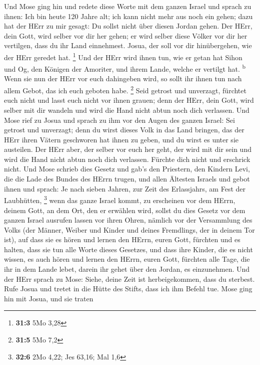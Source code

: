  Und Mose ging hin und redete diese Worte mit dem ganzen
Israel  und sprach zu ihnen: Ich bin heute 120 Jahre alt;
ich kann nicht mehr aus noch ein gehen; dazu hat der HErr zu mir gesagt:
Du sollst nicht über diesen Jordan gehen.  Der HErr, dein
Gott, wird selber vor dir her gehen; er wird selber diese Völker vor dir
her vertilgen, dass du ihr Land einnehmest. Josua, der soll vor dir
hinübergehen, wie der HErr geredet hat. \footnote{\textbf{31:3} 5Mo 3,28}
 Und der HErr wird ihnen tun, wie er getan hat Sihon und
Og, den Königen der Amoriter, und ihrem Lande, welche er vertilgt hat.
\textsuperscript{b}  Wenn sie nun der HErr vor euch
dahingeben wird, so sollt ihr ihnen tun nach allem Gebot, das ich euch
geboten habe. \footnote{\textbf{31:5} 5Mo 7,2}  Seid
getrost und unverzagt, fürchtet euch nicht und lasst euch nicht vor
ihnen grauen; denn der HErr, dein Gott, wird selber mit dir wandeln und
wird die Hand nicht abtun noch dich verlassen.  Und Mose
rief zu Josua und sprach zu ihm vor den Augen des ganzen Israel: Sei
getrost und unverzagt; denn du wirst dieses Volk in das Land bringen,
das der HErr ihren Vätern geschworen hat ihnen zu geben, und du wirst es
unter sie austeilen.  Der HErr aber, der selber vor euch
her geht, der wird mit dir sein und wird die Hand nicht abtun noch dich
verlassen. Fürchte dich nicht und erschrick nicht.  Und
Mose schrieb dies Gesetz und gab's den Priestern, den Kindern Levi, die
die Lade des Bundes des HErrn trugen, und allen Ältesten Israels
 und gebot ihnen und sprach: Je nach sieben Jahren, zur
Zeit des Erlassjahrs, am Fest der Laubhütten, \footnote{\textbf{32:6}
  2Mo 4,22; Jes 63,16; Mal 1,6}  wenn das ganze Israel
kommt, zu erscheinen vor dem HErrn, deinem Gott, an dem Ort, den er
erwählen wird, sollst du dies Gesetz vor dem ganzen Israel ausrufen
lassen vor ihren Ohren,  nämlich vor der Versammlung des
Volks (der Männer, Weiber und Kinder und deines Fremdlings, der in
deinem Tor ist), auf dass sie es hören und lernen den HErrn, euren Gott,
fürchten und es halten, dass sie tun alle Worte dieses Gesetzes,
 und dass ihre Kinder, die es nicht wissen, es auch hören
und lernen den HErrn, euren Gott, fürchten alle Tage, die ihr in dem
Lande lebet, darein ihr gehet über den Jordan, es einzunehmen.
 Und der HErr sprach zu Mose: Siehe, deine Zeit ist
herbeigekommen, dass du sterbest. Rufe Josua und tretet in die Hütte des
Stifts, dass ich ihm Befehl tue. Mose ging hin mit Josua, und sie traten
